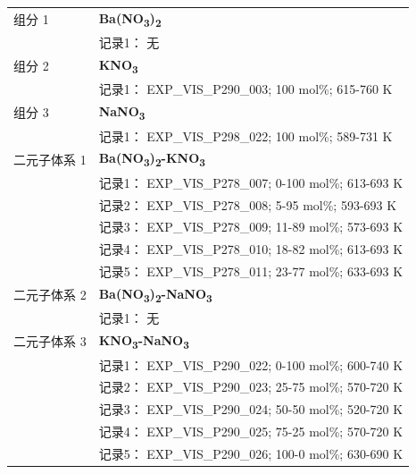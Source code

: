\documentclass[12pt]{article}
\begin{document}
{\begin{longtable}[]{@{}
  >{\raggedright\arraybackslash}p{}
  >{\raggedright\arraybackslash}p{}@{}}
组分 1 & \textbf{Ba(NO\textsubscript{3})\textsubscript{2}} \\
 & 记录1： 无 \\
组分 2  & \textbf{KNO\textsubscript{3}} \\
 & 记录1： EXP\_VIS\_P290\_003; 100 mol\%; 615-760 K  \\

组分 3  & \textbf{NaNO\textsubscript{3}} \\
 & 记录1： EXP\_VIS\_P298\_022; 100 mol\%; 589-731 K  \\

二元子体系 1  & \textbf{Ba(NO\textsubscript{3})\textsubscript{2}-KNO\textsubscript{3}} \\
 & 记录1： EXP\_VIS\_P278\_007; 0-100 mol\%; 613-693 K \\
 & 记录2： EXP\_VIS\_P278\_008; 5-95 mol\%; 593-693 K \\
 & 记录3： EXP\_VIS\_P278\_009; 11-89 mol\%; 573-693 K \\
 & 记录4： EXP\_VIS\_P278\_010; 18-82 mol\%; 613-693 K \\
 & 记录5： EXP\_VIS\_P278\_011; 23-77 mol\%; 633-693 K  \\

二元子体系 2 & \textbf{Ba(NO\textsubscript{3})\textsubscript{2}-NaNO\textsubscript{3}} \\
 & 记录1： 无 \\
二元子体系 3  & \textbf{KNO\textsubscript{3}-NaNO\textsubscript{3}} \\
 & 记录1： EXP\_VIS\_P290\_022; 0-100 mol\%; 600-740 K \\
 & 记录2： EXP\_VIS\_P290\_023; 25-75 mol\%; 570-720 K \\
 & 记录3： EXP\_VIS\_P290\_024; 50-50 mol\%; 520-720 K \\
 & 记录4： EXP\_VIS\_P290\_025; 75-25 mol\%; 570-720 K \\
 & 记录5： EXP\_VIS\_P290\_026; 100-0 mol\%; 630-690 K  \\


\end{longtable}}
\end{document}
